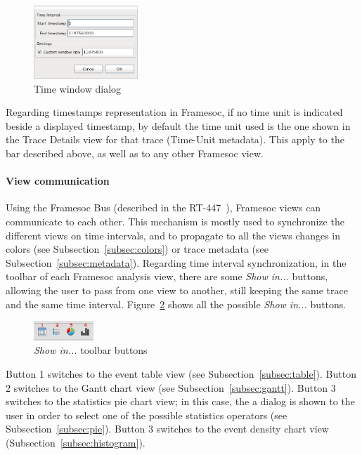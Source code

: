 \documentclass[twoside]{article}
\begin{document}
\begin{sloppypar}
\begin{figure}[h!]
  \centering
    \includegraphics[width=0.35\textwidth]{images/window_dialog.png}
  \caption{Time window dialog}
  \label{fig:window_dialog}
\end{figure}

Regarding timestamps representation in Framesoc, if no time unit is indicated beside a displayed timestamp, by default the time unit used is the one shown in the Trace Details view for that trace (Time-Unit metadata). This apply to the bar described above, as well as to any other Framesoc view.

\paragraph{View communication} Using the Framesoc Bus (described in the RT-447~\cite{pagano:hal-00977887}), Framesoc views can communicate to each other. This mechanism is mostly used to synchronize the different views on time intervals, and to propagate to all the views changes in colors (see Subsection~\ref{subsec:colors}) or trace metadata (see Subsection~\ref{subsec:metadata}).
Regarding time interval synchronization, in the toolbar of each Framesoc analysis view, there are some \emph{Show in...} buttons, allowing the user to pass from one view to another, still keeping the same trace and the same time interval. Figure~\ref{fig:show_in} shows all the possible \emph{Show in...} buttons. 

\begin{figure}[h!]
  \centering
    \includegraphics[width=0.2\textwidth]{images/show_in_icons.png}
  \caption{\emph{Show in...} toolbar buttons}
  \label{fig:show_in}
\end{figure}

Button \num{1} switches to the event table view (see Subsection~\ref{subsec:table}). Button \num{2} switches to the Gantt chart view (see Subsection~\ref{subsec:gantt}). Button \num{3} switches to the statistics pie chart view; in this case, the a dialog is shown to the user in order to select one of the possible statistics operators (see Subsection~\ref{subsec:pie}). Button \num{3} switches to the event density chart view (Subsection~\ref{subsec:histogram}).


\end{sloppypar}
\end{document}
